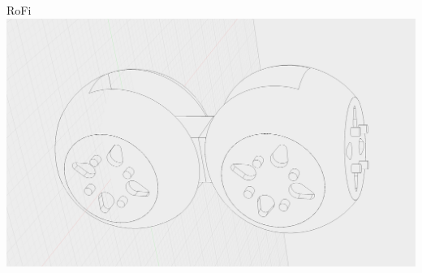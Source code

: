 \documentclass{beamer}
\begin{document}
\begin{frame}{RoFi}
    \includegraphics[width=\textwidth]{img/rofi1}
\end{frame}
\end{document}
